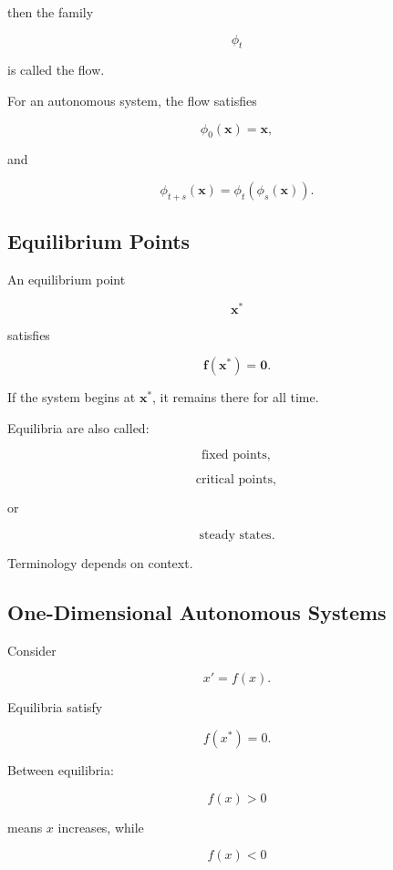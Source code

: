 then the family

\[
\boxed{
\phi_t
}
\]

is called the flow.

For an autonomous system, the flow satisfies

\[
\boxed{
\phi_0(\mathbf{x})
=
\mathbf{x},
}
\]

and

\[
\boxed{
\phi_{t+s}(\mathbf{x})
=
\phi_t
(
\phi_s(\mathbf{x})
).
}
\]

\subsection{Equilibrium Points}
\label{subsec:dynamical-equilibria}

An equilibrium point

\[
\boxed{
\mathbf{x}^*
}
\]

satisfies

\[
\boxed{
\mathbf{f}(\mathbf{x}^*)
=
\mathbf{0}.
}
\]

If the system begins at \(\mathbf{x}^*\), it remains there for all time.

Equilibria are also called:

\[
\boxed{
\text{fixed points},
}
\]

\[
\boxed{
\text{critical points},
}
\]

or

\[
\boxed{
\text{steady states}.
}
\]

Terminology depends on context.

\subsection{One-Dimensional Autonomous Systems}
\label{subsec:one-dimensional-dynamical-systems}

Consider

\[
\boxed{
x'
=
f(x).
}
\]

Equilibria satisfy

\[
\boxed{
f(x^*)=0.
}
\]

Between equilibria:

\[
f(x)>0
\]

means \(x\) increases, while

\[
f(x)<0
\]

